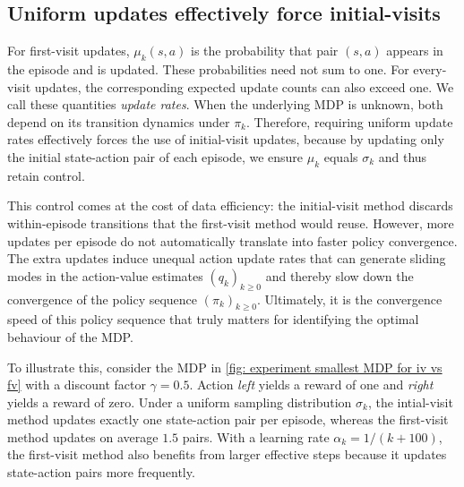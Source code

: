 \documentclass[twoside,11pt]{article}
\newcommand{\pol}{\pi}
\newcommand{\discount}{\gamma}
\newcommand{\worst}[1]{\overline{#1}} %
\newcommand{\best}[1]{{#1}_*}
\DeclareRobustCommand{\reviewbarstart}{%
  \ifhmode %
    \vadjust{\vbox to 0pt{%
      \vskip-\ht\strutbox %
      \vskip-\dp\strutbox %
      \cbstart[\changebarwidth] %
      \vss %
    }}%
  \else %
    \cbstart[\changebarwidth]%
  \fi %
} %
\providecommand{\DIFadd}[1]{#1} %
\providecommand{\DIFaddbegin}{\reviewbarstart} %
\providecommand{\DIFaddend}{\protect\cbend} %
\def\DIFadd#1{#1}%
\def\DIFaddbegin{}%
\def\DIFaddend{}%
\begin{document}


\subsection{Uniform updates effectively force initial-visits}


\DIFaddbegin \DIFadd{For first-visit updates, $\mu_k(s,a)$ is the probability that pair $(s,a)$ appears in the episode and is updated. These probabilities need not sum to one. For every-visit updates, the corresponding expected update counts can also exceed one. We call these quantities \emph{update rates}. }\DIFaddend When the underlying MDP is unknown,  \DIFaddbegin \DIFadd{both depend on its transition dynamics under }\DIFaddend $\pi_k$.
Therefore, requiring uniform update  \DIFaddbegin \DIFadd{rates }\DIFaddend effectively forces the use of initial-visit updates,
because by updating only the initial state-action pair of each episode, we ensure $\mu_k$ equals $\sigma_k$ and thus retain control.

This control comes at the cost of data efficiency: the initial-visit method discards within-episode transitions that the first-visit method would reuse. However, more updates per episode do not automatically translate into faster policy convergence.
The extra updates induce  \DIFaddbegin \DIFadd{unequal action update rates }\DIFaddend that can generate sliding modes in the action-value estimates $(q_k)_{k \ge 0}$ and thereby slow down the convergence of the policy sequence $(\pi_k)_{k \ge 0}$. Ultimately, it is the convergence speed of this policy sequence that truly matters for identifying the optimal behaviour of the MDP.

To illustrate this, consider the MDP in \autoref{fig: experiment smallest MDP for iv vs fv} with a discount factor $\discount = 0.5$. Action \textit{left} yields a reward of one and \textit{right} yields a reward of zero.
Under a uniform sampling distribution $\sigma_k$, the intial-visit method updates exactly one state-action pair per episode, whereas the first-visit method updates on average $1.5$ pairs.
With a learning rate $\alpha_k = 1/(k+100)$, the first-visit method also benefits from larger effective steps because it updates state-action pairs more frequently.
\end{document}
